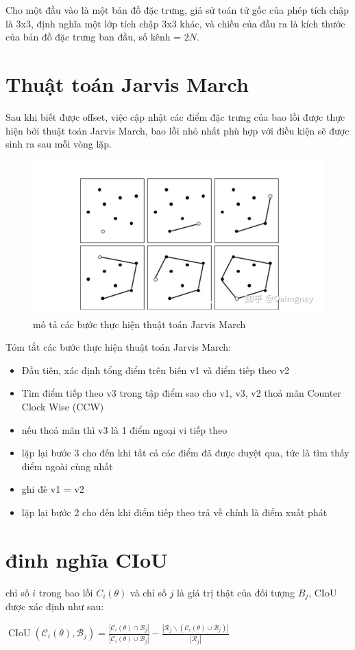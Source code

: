 \documentclass[12pt,a4paper,openany,oneside]{report}
\begin{document}
Cho một đầu vào là một bản đồ đặc trưng, giả sử toán tử gốc của phép tích chập là 3x3, định nghĩa một lớp tích chập 3x3 khác, và chiều của đầu ra là kích thước của bản đồ đặc trưng ban đầu, số kênh = $2N$.
\section{Thuật toán Jarvis March}
Sau khi biết được offset, việc cập nhật các điểm đặc trưng của bao lồi được thực hiện bởi thuật toán Jarvis March, bao lồi nhỏ nhất phù hợp với điều kiện sẽ được sinh ra sau mỗi vòng lặp.

\begin{figure}[ht!]
	\begin{center}
		\includegraphics[width=435px]{./jarvis_march_steps.jpg}
		\caption{mô tả các bước thực hiện thuật toán Jarvis March}
		\label{fig_dhandang1}
	\end{center}
\end{figure} 
Tóm tắt các bước thực hiện thuật toán Jarvis March:

\begin{itemize}
	\item Đầu tiên, xác định tổng điểm trên biên v1 và điểm tiếp theo v2
	\item Tìm điểm tiếp theo v3 trong tập điểm sao cho v1, v3, v2 thoả mãn Counter Clock Wise (CCW)
	\item nếu thoả mãn thì v3 là 1 điểm ngoại vi tiếp theo
	\item lặp lại bước 3 cho đến khi tất cả các điểm đã được duyệt qua, tức là tìm thấy điểm ngoài cùng nhất
	\item ghi đè v1 = v2
	\item lặp lại bước 2 cho đến khi điểm tiếp theo trả về chính là điểm xuất phát
\end{itemize}

\section{đinh nghĩa CIoU}
chỉ số $i$ trong bao lồi $C_i(\theta)$ và chỉ số $j$ là giá trị thật của đối tượng $B_j$, CIoU được xác định như sau:
\begin{center}
	$\operatorname{CIoU}\left(\mathcal{C}_i(\theta), \mathcal{B}_j\right)=\frac{\left|\mathcal{C}_i(\theta) \cap \mathcal{B}_j\right|}{\left|\mathcal{C}_i(\theta) \cup \mathcal{B}_j\right|}-\frac{\left|\mathcal{R}_j \backslash\left(\mathcal{C}_i(\theta) \cup \mathcal{B}_j\right)\right|}{\left|\mathcal{R}_j\right|}$
\end{center}
\end{document}
